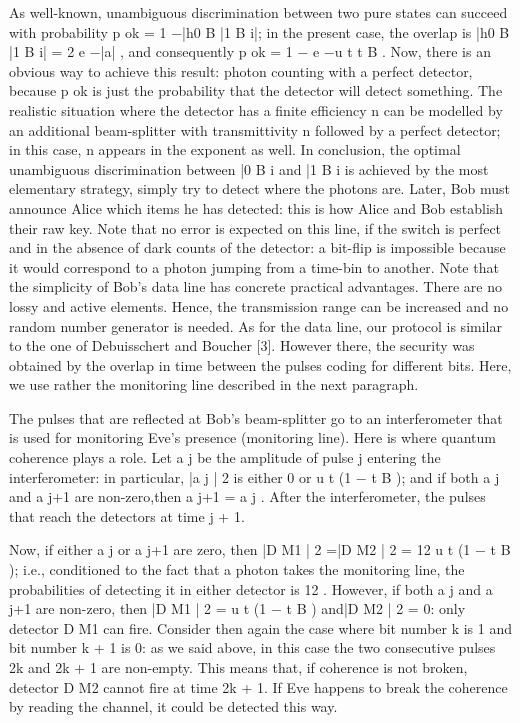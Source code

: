 As well-known, unambiguous discrimination between two pure states can succeed with probability p ok = 1 −|h0 B |1 B i|; in the present case, the overlap is |h0 B |1 B i| = 2 e −|a| , and consequently p ok = 1 − e −u t t B . Now, there is an obvious way to achieve this result: photon counting with a perfect detector, because p ok is just the probability that the detector will detect something. The realistic situation where the detector has a finite efficiency n can be modelled by an additional beam-splitter with transmittivity n followed by a perfect detector; in this case, n appears in the exponent as well. In conclusion, the optimal unambiguous discrimination between |0 B i and |1 B i is achieved by the most elementary strategy, simply try to detect where the photons are. Later, Bob must announce Alice which items he has detected: this is how Alice and Bob establish their raw key. Note that no error is expected on this line, if the switch is perfect and in the absence of dark counts of the detector: a bit-flip is impossible because it would correspond to a photon jumping from a time-bin to another. Note that the simplicity of Bob’s data line has concrete practical advantages. There are no lossy and active elements. Hence, the transmission range can be increased and no random number generator is needed. As for the data line, our protocol is similar to the one of Debuisschert and Boucher [3]. However there, the security was obtained by the overlap in time between the pulses coding for different bits. Here, we use rather the monitoring line described in the next paragraph.

The pulses that are reflected at Bob’s beam-splitter go to an interferometer that is used for monitoring Eve’s presence (monitoring line). Here is where quantum coherence plays a role. Let a j be the amplitude of pulse j entering the interferometer: in particular, |a j | 2 is either 0 or u t (1 − t B ); and if both a j and a j+1 are non-zero,then a j+1 = a j . After the interferometer, the pulses that reach the detectors at time j + 1.


Now, if either a j or a j+1 are zero, then |D M1 | 2 =|D M2 | 2 = 12 u t (1 − t B ); i.e., conditioned to the fact that a photon takes the monitoring line, the probabilities of detecting it in either detector is 12 . However, if both a j and a j+1 are non-zero, then |D M1 | 2 = u t (1 − t B ) and|D M2 | 2 = 0: only detector D M1 can fire. Consider then again the case where bit number k is 1 and bit number k + 1 is 0: as we said above, in this case the two consecutive pulses 2k and 2k + 1 are non-empty. This means that, if coherence is not broken, detector D M2 cannot fire at time 2k + 1. If Eve happens to break the coherence by reading the channel, it could be detected this way.

